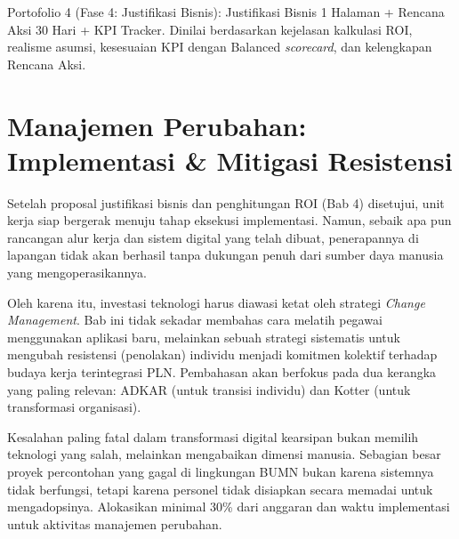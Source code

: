 \documentclass[12pt,a4paper]{report}
\begin{document}
\begin{outputbox}
Portofolio 4 (Fase 4: Justifikasi Bisnis): Justifikasi Bisnis 1 Halaman + Rencana Aksi 30 Hari + KPI Tracker. Dinilai berdasarkan kejelasan kalkulasi ROI, realisme asumsi, kesesuaian KPI dengan Balanced \textit{scorecard}, dan kelengkapan Rencana Aksi.
\end{outputbox}


\chapter{Manajemen Perubahan: Implementasi \& Mitigasi Resistensi}

Setelah proposal justifikasi bisnis dan penghitungan ROI (Bab 4) disetujui, unit kerja siap bergerak menuju tahap eksekusi implementasi. Namun, sebaik apa pun rancangan alur kerja dan sistem digital yang telah dibuat, penerapannya di lapangan tidak akan berhasil tanpa dukungan penuh dari sumber daya manusia yang mengoperasikannya. 

Oleh karena itu, investasi teknologi harus diawasi ketat oleh strategi \textit{Change Management}. Bab ini tidak sekadar membahas cara melatih pegawai menggunakan aplikasi baru, melainkan sebuah strategi sistematis untuk mengubah resistensi (penolakan) individu menjadi komitmen kolektif terhadap budaya kerja terintegrasi PLN. Pembahasan akan berfokus pada dua kerangka yang paling relevan: ADKAR (untuk transisi individu) dan Kotter (untuk transformasi organisasi).

\begin{warnbox}
Kesalahan paling fatal dalam transformasi digital kearsipan bukan memilih teknologi yang salah, melainkan mengabaikan dimensi manusia. Sebagian besar proyek percontohan yang gagal di lingkungan BUMN bukan karena sistemnya tidak berfungsi, tetapi karena personel tidak disiapkan secara memadai untuk mengadopsinya. Alokasikan minimal 30\% dari anggaran dan waktu implementasi untuk aktivitas manajemen perubahan.
\end{warnbox}

\end{document}
